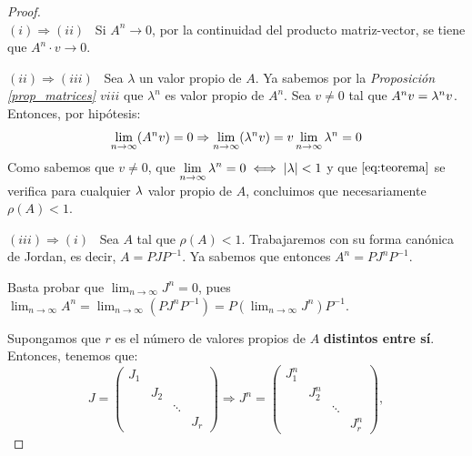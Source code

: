 \begin{proof}\hfill\\
    $\boxed{(i) \Rightarrow (ii)}$ \ Si $A^n \rightarrow 0$, por la continuidad del producto matriz-vector, se tiene que $A^n \cdot v \rightarrow 0$.

    $\boxed{(ii) \Rightarrow (iii)}$ \ Sea $\lambda$ un valor propio de $A$. Ya sabemos por la \textit{Proposición \ref{prop_matrices} $viii$} que $\lambda^n$ es valor propio de $A^n$. Sea $v\ne 0$ tal que $A^n v = \lambda^n v$. Entonces, por hipótesis: \begin{equation} \label{eq:teorema}
\lim_{n \to \infty}(A^n v) = 0 \Rightarrow \lim_{n \to \infty} (\lambda^n v) = v\lim_{n\to\infty} \lambda^n = 0
\end{equation}
   Como sabemos que $v\ne0$, que $\displaystyle \lim_{n\to\infty} \lambda^n = 0 \iff |\lambda| < 1$ y que $\eqref{eq:teorema}$ se verifica para cualquier $\lambda$ valor propio de $A$, concluimos que necesariamente $\rho(A) < 1$.

    $\boxed{(iii) \Rightarrow (i)}$ \ Sea $A$ tal que $\rho(A) < 1$. Trabajaremos con su forma canónica de Jordan, es decir, $A = PJP^{-1}$. Ya sabemos que entonces $A^n = PJ^nP^{-1}$.

    Basta probar que $\displaystyle \lim_{n \to \infty} J^n = 0$, pues $\displaystyle \lim_{n \to \infty} A^n = \lim_{n \to \infty} (PJ^nP^{-1}) = P(\lim_{n \to \infty} J^n)P^{-1}$.

    Supongamos que $r$ es el número de valores propios de $A$ \textbf{distintos entre sí}. Entonces, tenemos que: $$J = \begin{pmatrix}
        J_1 & & & \\
            & J_2 & & \\
            & & \ddots & \\
            & & & J_r
    \end{pmatrix} \Rightarrow J^n = \begin{pmatrix}
         J_1^n & & & \\
            & J_2^n & & \\
            & & \ddots & \\
            & & & J_r^n
    \end{pmatrix},$$


\end{proof}
